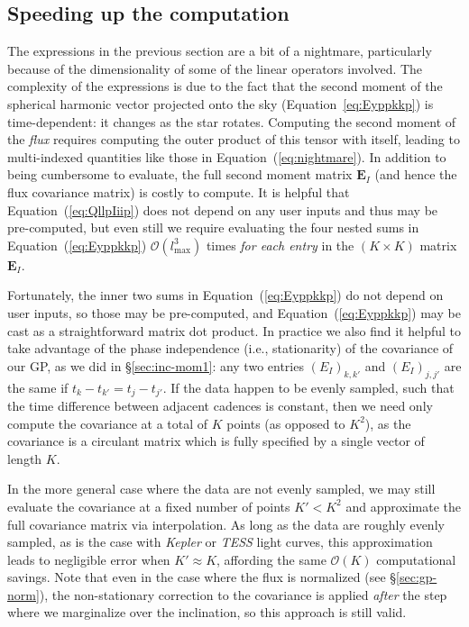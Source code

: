 \documentclass[modern,linenumbers]{aastex62}
\begin{document}
\subsection{Speeding up the computation}
\label{sec:inc-speedup}
%
The expressions in the previous section are a bit of a nightmare,
particularly because of the dimensionality of some of the linear
operators involved. The complexity of the expressions is due to
the fact that the second moment of the spherical harmonic vector
projected onto the sky (Equation~\ref{eq:Eyppkkp}) is time-dependent:
it changes as the star rotates. Computing the second moment of the
\emph{flux} requires computing the outer product of this tensor
with itself, leading to multi-indexed quantities like those in
Equation~(\ref{eq:nightmare}). In addition to being cumbersome to
evaluate, the full second moment matrix $\mathbf{E}_I$
(and hence the flux covariance matrix) is costly to compute.
It is helpful that Equation~(\ref{eq:QllpIiip}) does not depend
on any user inputs and thus may be pre-computed, but even still
we require evaluating the four nested sums
in Equation~(\ref{eq:Eyppkkp})
$\mathcal{O}(l_\mathrm{max}^3)$ times
\emph{for each entry} in the $(K \times K)$ matrix $\mathbf{E}_I$.

Fortunately, the inner two sums in Equation~(\ref{eq:Eyppkkp})
do not depend on user inputs, so those may be pre-computed,
and Equation~(\ref{eq:Eyppkkp}) may be cast as a straightforward
matrix dot product. In practice we also find it helpful to
take advantage of the phase independence (i.e., stationarity)
of the covariance of our GP, as we did in \S\ref{sec:inc-mom1}:
any two entries $(E_I)_{k,k'}$ and $(E_I)_{j,j'}$ are
the same if $t_{k} - t_{k'} = t_{j} - t_{j'}$. If the data
happen to be evenly sampled, such that the time difference between
adjacent cadences is constant, then we need only compute the
covariance at a total of $K$ points (as opposed to $K^2$), as the
covariance is a circulant matrix which is fully specified by a
single vector of length $K$.

In the more general case where the data are not evenly sampled,
we may still evaluate the covariance at a fixed number of points
$K' < K^2$ and approximate the full covariance matrix via
interpolation. As long as the data are roughly evenly sampled,
as is the case with \emph{Kepler} or \emph{TESS} light curves,
this approximation leads to negligible error when $K' \approx K$,
affording the same $\mathcal{O}(K)$ computational savings.
Note that even in the case where the flux is normalized
(see \S\ref{sec:gp-norm}), the non-stationary correction to the
covariance is applied \emph{after} the step where we marginalize
over the inclination, so this approach is still valid.
\end{document}
